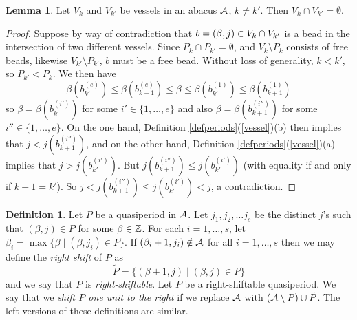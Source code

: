 \documentclass[12pt]{amsart}
\numberwithin{equation}{section}
\theoremstyle{definition}
\newtheorem{lemma}[equation]{Lemma}
\newtheorem{definition}[equation]{Definition}
\newcommand{\emp}{\emptyset}
\begin{document}
\begin{lemma}\label{lemvessels}
Let $V_k$ and $V_{k'}$ be vessels in an abacus $\mathcal{A}$, $k\neq k'$. Then $V_k\cap V_{k'} = \emp$.
\end{lemma}

\begin{proof}
Suppose by way of contradiction that $b=(\beta,j)\in V_k\cap V_{k'}$ is a bead in the intersection of two different vessels. Since $P_k\cap P_{k'}=\emp$, and $V_k\setminus P_k$ consists of free beads, likewise $V_{k'}\setminus P_{k'}$, $b$ must be a free bead.
Without loss of generality, $k<k'$, so $P_{k'}<P_k$. We then have 
$$\beta(b_{k'}^{(e)}) \leq \beta(b_{k+1}^{(e)}) \leq \beta \leq \beta(b_{k'}^{(1)}) \leq \beta(b_{k+1}^{(1)}) $$
so $\beta=\beta(b_{k'}^{(i')})$ for some $i'\in\{1,\dots,e\}$ and also $\beta=\beta(b_{k+1}^{(i'')})$ for some $i''\in\{1,\dots,e\}$. On the one hand, Definition \ref{defperiods}(\ref{vessel})(b) then implies that $j<j(b_{k+1}^{(i'')})$, and on the other hand, Definition \ref{defperiods}(\ref{vessel})(a) implies that $j>j(b_{k'}^{(i')})$. But $j(b_{k+1}^{(i'')})\leq j(b_{k'}^{(i')})$ (with equality if and only if $k+1=k'$). So $j<j(b_{k+1}^{(i'')})\leq j(b_{k'}^{(i')})<j$, a contradiction.
\end{proof}



 \begin{definition} Let $P$ be a quasiperiod in $\mathcal{A}$. Let $j_1,j_2,\dots j_s$ 
 be the distinct $j$'s such that $(\beta,j)\in P$ for some $\beta\in\mathbb{Z}$. For each $i=1,\dots,s$, let $\beta_i=\max\{\beta\;|\;(\beta,j_i)\in P\}$. If $(\beta_i+1,j_i)\notin \mathcal{A}$ for all $i=1,\dots,s$ then we may define the \textit{right shift} of $P$ as $$\tilde{P}=\{(\beta+1,j)\;|\;(\beta,j)\in P \}$$ and we say that $P$ is \textit{right-shiftable}. Let $P$ be a right-shiftable quasiperiod. We say that we \textit{shift $P$ one unit to the right} if we replace $\mathcal{A}$ with $(\mathcal{A}\setminus P)\cup \tilde{P}$. The left versions of these definitions are similar.
 \end{definition}
 
\end{document}
